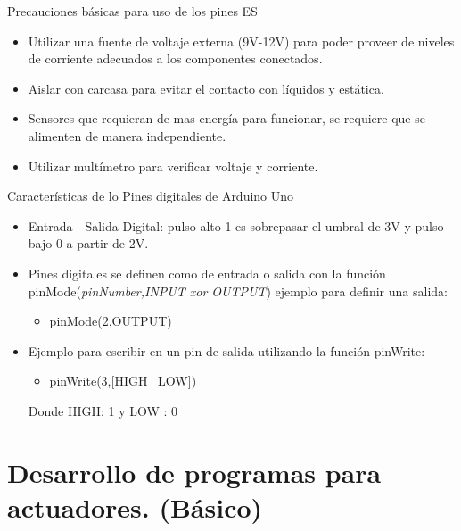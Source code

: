 \documentclass{beamer}
\begin{document}
\begin{frame}{Precauciones básicas para uso de los pines E\/S}

\begin{itemize}
\item Utilizar una fuente de voltaje externa (9V-12V) para poder proveer de niveles de corriente adecuados a los componentes conectados.
\item Aislar con carcasa para evitar el contacto con líquidos y estática.
\item Sensores que requieran de mas energía para funcionar, se requiere que se alimenten de manera independiente.
\item Utilizar multímetro para verificar voltaje y corriente.
\end{itemize}

\end{frame}



\begin{frame}{Características de lo Pines digitales de Arduino Uno}

\begin{itemize}
\item Entrada - Salida Digital: pulso alto 1 es sobrepasar el umbral de 3V y pulso bajo 0 a partir de 2V.
\item Pines digitales se definen como de entrada o salida con la función pinMode(\textit{pinNumber,INPUT xor OUTPUT}) ejemplo para definir una salida:
\begin{itemize}
\item pinMode(2,OUTPUT)
\end{itemize}
\item Ejemplo para escribir en un pin de salida utilizando la función pinWrite:
\begin{itemize}
\item pinWrite(3,[HIGH \ LOW])
\end{itemize}
Donde HIGH: 1 y LOW : 0
\end{itemize}

\end{frame}


\section{Desarrollo de programas para actuadores. (Básico)}
\end{document}
